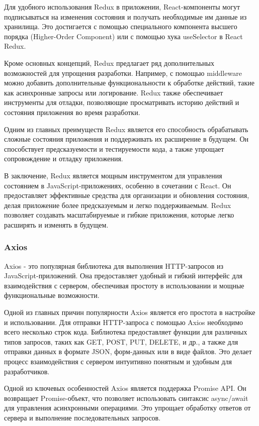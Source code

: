 Для удобного использования Redux в приложении, React-компоненты могут подписываться на изменения состояния и получать необходимые им данные из хранилища. Это достигается с помощью специального компонента высшего порядка (Higher-Order Component) или с помощью хука useSelector в React Redux.

Кроме основных концепций, Redux предлагает ряд дополнительных возможностей для упрощения разработки. Например, с помощью middleware можно добавить дополнительные функциональности к обработке действий, такие как асинхронные запросы или логирование. Redux также обеспечивает инструменты для отладки, позволяющие просматривать историю действий и состояния приложения во время разработки.

Одним из главных преимуществ Redux является его способность обрабатывать сложные состояния приложения и поддерживать их расширение в будущем. Он способствует предсказуемости и тестируемости кода, а также упрощает сопровождение и отладку приложения.

В заключение, Redux является мощным инструментом для управления состоянием в JavaScript-приложениях, особенно в сочетании с React. Он предоставляет эффективные средства для организации и обновления состояния, делая приложение более предсказуемым и легко поддерживаемым. Redux позволяет создавать масштабируемые и гибкие приложения, которые легко расширять и изменять в будущем.

\subsubsection{Axios}

Axios - это популярная библиотека для выполнения HTTP-запросов из JavaScript-приложений. Она предоставляет удобный и гибкий интерфейс для взаимодействия с сервером, обеспечивая простоту в использовании и мощные функциональные возможности.

Одной из главных причин популярности Axios является его простота в настройке и использовании. Для отправки HTTP-запроса с помощью Axios необходимо всего несколько строк кода. Библиотека предоставляет функции для различных типов запросов, таких как GET, POST, PUT, DELETE, и др., а также для отправки данных в формате JSON, форм-данных или в виде файлов. Это делает процесс взаимодействия с сервером интуитивно понятным и удобным для разработчиков.

Одной из ключевых особенностей Axios является поддержка Promise API. Он возвращает Promise-объект, что позволяет использовать синтаксис async/await для управления асинхронными операциями. Это упрощает обработку ответов от сервера и выполнение последовательных запросов.

